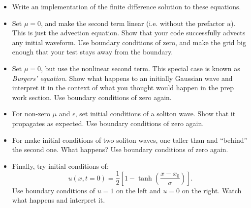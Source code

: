 \documentclass[11pt, preprint]{aastex}
\begin{document}
\begin{itemize}
\item Write an implementation of the finite difference solution to
  these equations.
\item Set $\mu = 0$, and make the second term linear
  (i.e. without the prefactor $u$). This is just the advection
  equation. Show that your code successfully advects any initial
  waveform. Use boundary conditions of zero, and make the grid big
  enough that your test stays away from the boundary.
\item Set $\mu = 0$, but use the nonlinear second term. This
  special case is known as {\it Burgers' equation}. Show what happens
  to an initially Gaussian wave and interpret it in the context of
  what you thought would happen in the prep work section. Use boundary
  conditions of zero again.
\item For non-zero $\mu$ and $\epsilon$, set initial conditions of a
  soliton wave. Show that it propagates as expected. Use boundary
  conditions of zero again.
\item For make initial conditions of two soliton waves, one taller
  than and ``behind'' the second one. What happens? Use boundary
  conditions of zero again.
\item Finally, try initial conditions of:
  \begin{equation}
    u(x, t=0) = \frac{1}{2} \left[1 -
      \tanh\left(\frac{x-x_0}{\sigma}\right)\right].
  \end{equation}
  Use boundary conditions of $u=1$ on the left and $u=0$ on the
  right. Watch what happens and interpret it.
\end{itemize}
\end{document}
